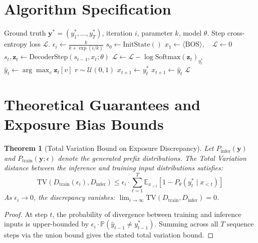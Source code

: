 \documentclass[11pt,a4paper]{article}
\newtheorem{theorem}{Theorem}
\theoremstyle{definition}
\begin{document}
\section{Algorithm Specification}

\begin{algorithm}[H]
\caption{Scheduled Sampling Sequence Training Step}
\label{alg:scheduled_sampling}
\begin{algorithmic}[1]
\Require Ground truth $\mathbf{y}^* = (y_1^*, \dots, y_T^*)$, iteration $i$, parameter $k$, model $\theta$.
\Ensure Step cross-entropy loss $\mathcal{L}$.
\State $\epsilon_i \gets \frac{k}{k + \exp(i / k)}$
\State $s_0 \gets \text{InitState}()$
\State $x_1 \gets \langle \text{BOS} \rangle, \quad \mathcal{L} \gets 0$
    \State $s_t, \mathbf{z}_t \gets \text{DecoderStep}(s_{t-1}, x_t; \theta)$
    \State $\mathcal{L} \gets \mathcal{L} - \log \text{Softmax}(\mathbf{z}_t)_{y_t^*}$
    \State $\hat{y}_t \gets \arg\max_v \mathbf{z}_t[v]$
    \State $r \sim \mathcal{U}(0, 1)$
        \State $x_{t+1} \gets y_t^*$ 
    \Else
        \State $x_{t+1} \gets \hat{y}_t$ 
    \EndIf
\EndFor
\State \Return $\mathcal{L}$
\end{algorithmic}
\end{algorithm}

\section{Theoretical Guarantees and Exposure Bias Bounds}

\begin{theorem}[Total Variation Bound on Exposure Discrepancy]
\label{thm:exposure_bias}
Let $P_{\text{infer}}(\mathbf{y})$ and $P_{\text{train}}(\mathbf{y}; \epsilon)$ denote the generated prefix distributions. The Total Variation distance between the inference and training input distributions satisfies:
\begin{equation}
\text{TV}(D_{\text{train}}(\epsilon_i), D_{\text{infer}}) \le \epsilon_i \cdot \sum_{t=1}^T \mathbb{E}_{x_{<t}}[1 - P_\theta(y_t^* \mid x_{<t})]
\end{equation}
As $\epsilon_i \to 0$, the discrepancy vanishes: $\lim_{i \to \infty} \text{TV}(D_{\text{train}}, D_{\text{infer}}) = 0$.
\end{theorem}

\begin{proof}
At step $t$, the probability of divergence between training and inference inputs is upper-bounded by $\epsilon_i \cdot \mathbb{P}(\hat{y}_{t-1} \ne y_{t-1}^*)$. Summing across all $T$ sequence steps via the union bound gives the stated total variation bound.
\end{proof}
\end{document}
